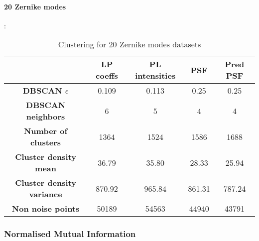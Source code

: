 		\paragraph{20 Zernike modes}:
		\begin{table}[h!]
			\centering
			\begin{tabular}{|c|c|c|c|c|}
				\hline
				\textbf{} & \textbf{LP coeffs} & \textbf{PL intensities} & \textbf{PSF} & \textbf{Pred PSF}\\
				\hline
				\textbf{DBSCAN $\epsilon$} & 0.109 & 0.113 & 0.25 & 0.25\\
				\hline
				\textbf{DBSCAN neighbors} & 6 & 5 & 4 & 4\\
				\hline
				\textbf{Number of clusters} & 1364 & 1524 & 1586 & 1688\\
				\hline
				\textbf{Cluster density mean} & 36.79 & 35.80 & 28.33 & 25.94\\
				\hline
				\textbf{Cluster density variance} & 870.92 & 965.84 & 861.31 & 787.24\\
				\hline
				\textbf{Non noise points} & 50189 & 54563 & 44940 & 43791\\
				\hline
			\end{tabular}
		\caption{Clustering for 20 Zernike modes datasets}
		\end{table}
		\FloatBarrier
		
		
	\subsubsection{Normalised Mutual Information}
		

